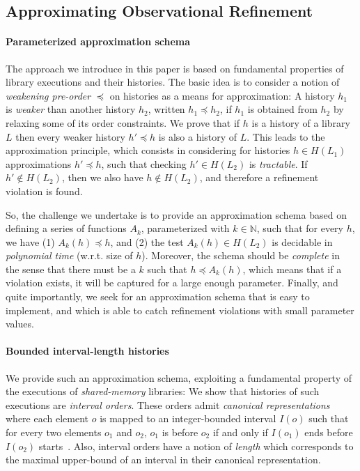 \subsection{Approximating Observational Refinement}
\label{sec:intro:approx}

\paragraph{Parameterized approximation schema}

The approach we introduce in this paper is based on fundamental properties of
library executions and their histories. The basic idea is to consider a notion
of \emph{weakening pre-order} $\preceq$ on histories as a means for
approximation: A history $h_1$ is \emph{weaker} than another history $h_2$,
written $h_1 \preceq h_2$, if $h_1$ is obtained from $h_2$ by relaxing some of
its order constraints. We prove that if $h$ is a history of a library $L$ then
every weaker history $h'\preceq h$ is also a history of $L$. This leads to the
approximation principle, which consists in considering for histories $h\in
H(L_1)$ approximations $h' \preceq h$, such that checking $h' \in H(L_2)$ is
\emph{tractable}. If $h' \not\in H(L_2)$, then we also have $h \not\in H(L_2)$,
and therefore a refinement violation is found.

So, the challenge we undertake is to provide an approximation schema based on
defining a series of functions $A_k$, parameterized with $k \in \mathbb{N}$,
such that for every $h$, we have (1) $A_k (h) \preceq h$, and (2) the test
$A_k(h) \in H(L_2)$ is decidable in \emph{polynomial time} (w.r.t. size of
$h$). Moreover, the schema should be \emph{complete} in the sense that there
must be a $k$ such that $h \preceq A_k(h)$, which means that if a violation
exists, it will be captured for a large enough parameter. Finally, and quite
importantly, we seek for an approximation schema that is easy to implement, and
which is able to catch refinement violations with small parameter values.

\paragraph{Bounded interval-length histories}

We provide such an approximation schema, exploiting a fundamental property of
the executions of \emph{shared-memory} libraries: We show that histories of
such executions are \emph{interval orders}. These orders admit \emph{canonical
representations} where each element $o$ is mapped to an integer-bounded
interval $I(o)$ such that for every two elements $o_1$ and $o_2$, $o_1$ is
before $o_2$ if and only if $I(o_1)$ ends before $I(o_2)$
starts~\cite{phd/Greenough76}. Also, interval orders have a notion of
\emph{length} which corresponds to the maximal upper-bound of an interval in
their canonical representation.

